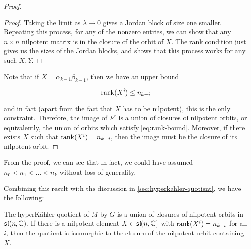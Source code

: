 \documentclass{article}
\renewcommand{\sl}{\mathfrak{sl}}
\begin{document}
\begin{proof}
\begin{proof}
        Taking the limit as \(\lambda \to 0\) gives a Jordan block of size one smaller. Repeating this process, for any of the nonzero entries, we can show that any \(n \times n\) nilpotent matrix is in the closure of the orbit of \(X\). The rank condition just gives us the sizes of the Jordan blocks, and shows that this process works for any such \(X, Y\).
    \end{proof}

    Note that if \(X = \alpha_{k-1}\beta_{k-1}\), then we have an upper bound

    \begin{equation}
        \label{eq:rank-bound}
        \rank(X^i) \le n_{k-i}
    \end{equation}

    and in fact (apart from the fact that \(X\) has to be nilpotent), this is the only constraint. Therefore, the image of \(\Phi^c\) is a union of closures of nilpotent orbits, or equivalently, the union of orbits which satisfy \cref{eq:rank-bound}. Moreover, if there exists \(X\) such that \(\rank(X^i) = n_{k-i}\), then the image must be the closure of its nilpotent orbit.
\end{proof}

\begin{remark}
    From the proof, we can see that in fact, we could have assumed \(n_0 < n_1 < \dots < n_k\) without loss of generality.
\end{remark}

Combining this result with the discussion in \cref{sec:hyperkahler-quotient}, we have the following:

\begin{theorem}
    The hyperK\"ahler quotient of \(M\) by \(G\) is a union of closures of nilpotent orbits in \(\sl(n, \C)\). If there is a nilpotent element \(X \in \sl(n, \C)\) with \(\rank(X^i) = n_{k-i}\) for all \(i\), then the quotient is isomorphic to the closure of the nilpotent orbit containing \(X\).
\end{theorem}

\printbibliography
\end{document}
